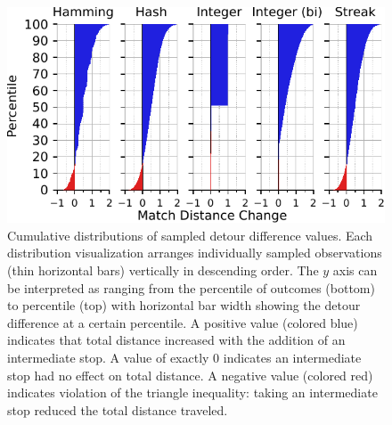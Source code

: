 \begin{figure}[!htbp]
\begin{center}
\includegraphics[width=\linewidth]{img/detour_difference/bitweight=0dot5+seed=1+title=low-triplet-analysis+_data_hathash_hash=6b0749ef97a58721+_script_fullcat_hash=2ded962cad675fe3+ext=}
\caption{
Cumulative distributions of sampled detour difference values.
Each distribution visualization arranges individually sampled observations (thin horizontal bars) vertically in descending order.
The $y$ axis can be interpreted as ranging from the  percentile of outcomes (bottom) to  percentile (top) with horizontal bar width showing the detour difference at a certain percentile.
A positive value (colored blue) indicates that total distance increased with the addition of an intermediate stop.
A value of exactly 0 indicates an intermediate stop had no effect on total distance.
A negative value (colored red) indicates violation of the triangle inequality: taking an intermediate stop reduced the total distance traveled.
}
\label{fig:detour_difference_supp}

\end{center}
\end{figure}
